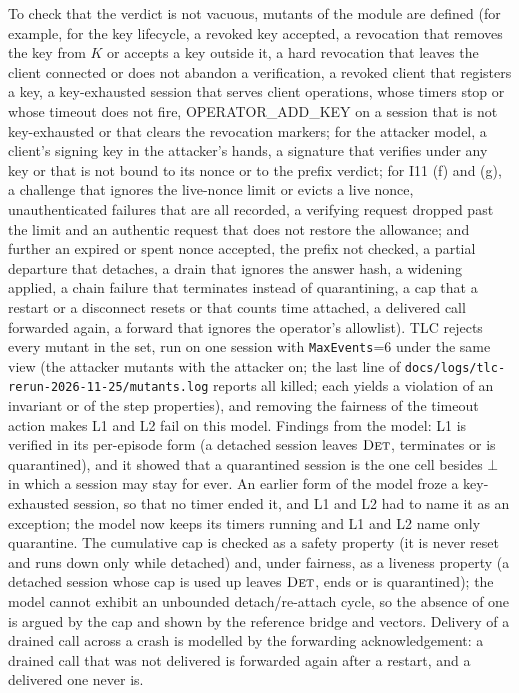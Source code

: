 To check that the verdict is not vacuous, mutants of the module are
defined (for example, for the key lifecycle, a revoked key accepted, a
revocation that removes the key from $K$ or accepts a key outside it, a hard
revocation that leaves the client connected or does not abandon a
verification, a revoked client that registers a key, a key-exhausted session
that serves client operations, whose timers stop or whose timeout does not fire,
OPERATOR\_ADD\_KEY on a session that is not key-exhausted or that clears the
revocation markers; for the attacker model, a client's signing key in the attacker's hands, a signature that verifies under any key or that is not bound to its nonce or to the prefix verdict; for I11 (f) and (g), a challenge that ignores the live-nonce limit or evicts a live nonce, unauthenticated failures that are all recorded, a verifying request dropped past the limit and an authentic request that does not restore the allowance; and further an expired or spent nonce accepted, the prefix not
checked, a partial departure that detaches, a drain that ignores the answer
hash, a widening applied, a chain failure that terminates instead of
quarantining, a cap that a restart or a disconnect resets or that counts
time attached, a delivered call forwarded again, a forward that ignores
the operator's allowlist). TLC rejects every mutant in the set, run on one session with \texttt{MaxEvents}=6 under the same view (the attacker mutants with the attacker on; the last line of
\texttt{docs/logs/tlc-rerun-2026-11-25/mutants.log} reports all killed; each yields a violation
of an invariant or of the step properties), and removing the fairness of
the timeout action makes L1 and L2 fail on this model. Findings from the
model: L1 is verified in its per-episode form (a detached session leaves
$\textsc{Det}$, terminates or is quarantined), and it showed that a
quarantined session is the one cell besides $\bot$ in which a session may
stay for ever. An earlier form of the model froze a key-exhausted session,
so that no timer ended it, and L1 and L2 had to name it as an exception;
the model now keeps its timers running and L1 and L2 name only quarantine. The cumulative
cap is checked as a safety property (it is never reset and runs down only
while detached) and, under fairness, as a liveness property (a detached
session whose cap is used up leaves $\textsc{Det}$, ends or is quarantined);
the model cannot exhibit an unbounded detach/re-attach cycle, so the
absence of one is argued by the cap and shown by the reference bridge and
vectors. Delivery of a drained call across a crash is modelled by the
forwarding acknowledgement: a drained call that was not delivered is
forwarded again after a restart, and a delivered one never is.

